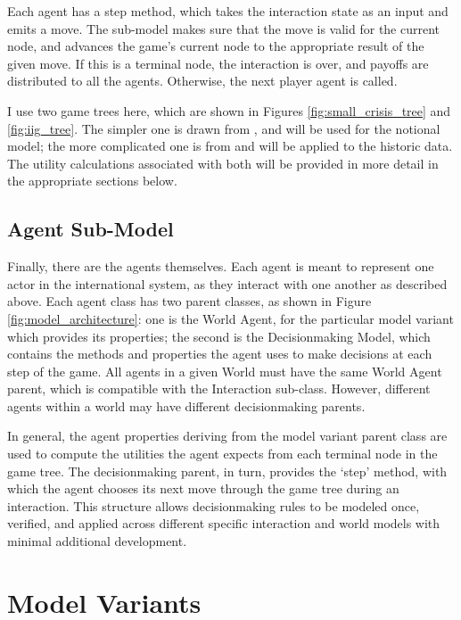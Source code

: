Each agent has a step method, which takes the interaction state as an input and emits a move. The sub-model makes sure that the move is valid for the current node, and advances the game's current node to the appropriate result of the given move. If this is a terminal node, the interaction is over, and payoffs are distributed to all the agents. Otherwise, the next player agent is called.

I use two game trees here, which are shown in Figures \ref{fig:small_crisis_tree} and \ref{fig:iig_tree}. The simpler one is drawn from \citet{signorino_1999}, and will be used for the notional model; the more complicated one is from \citet{bdm_1992} and will be applied to the historic data. The utility calculations associated with both will be provided in more detail in the appropriate sections below.

\subsection{Agent Sub-Model}

Finally, there are the agents themselves. Each agent is meant to represent one actor in the international system, as they interact with one another as described above. Each agent class has two parent classes, as shown in Figure \ref{fig:model_architecture}: one is the World Agent, for the particular model variant which provides its properties; the second is the Decisionmaking Model, which contains the methods and properties the agent uses to make decisions at each step of the game. All agents in a given World must have the same World Agent parent, which is compatible with the Interaction sub-class. However, different agents within a world may have different decisionmaking parents.

In general, the agent properties deriving from the model variant parent class are used to compute the utilities the agent expects from each terminal node in the game tree. The decisionmaking parent, in turn, provides the `step' method, with which the agent chooses its next move through the game tree during an interaction. This structure allows decisionmaking rules to be modeled once, verified, and applied across different specific interaction and world models with minimal additional development. 

\section{Model Variants}


